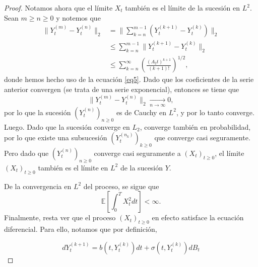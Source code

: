 \documentclass[letterpaper]{article}
\renewcommand{\to}{\rightarrow}
\newcommand{\E}{\mathbb{E}}
\newcommand{\1}{\mathds{1}}
\theoremstyle{definition}
\theoremstyle{definition}
\theoremstyle{definition}
\theoremstyle{definition}
\theoremstyle{definition}
\begin{document}
\begin{enumerate}
\begin{proof}
            Notamos ahora que el límite $X_t$ también es el límite de la sucesión en $L^2$. Sean $m\geq n\geq0$ y notemos que 
            \begin{align*}
                \|Y_t^{(m)}-Y_t^{(n)}\|_2&=\|\sum_{k=n}^{m-1}(Y_t^{(k+1)}-Y_t^{(k)})\|_2\\
                &\leq \sum_{k=n}^{m-1}\|Y_t^{(k+1)}-Y_t^{(k)}\|_2\\
                &\leq \sum_{k=n}^{\infty}\left(\frac{(A_2t)^{k+1}}{(k+1)!}\right)^{1/2},
            \end{align*}
            donde hemos hecho uso de la ecuación \eqref{eq5}. Dado que los coeficientes de la serie 
            anterior convergen (se trata de una serie exponencial), entonces se tiene que 
            \[
                \|Y_t^{(m)}-Y_t^{(n)}\|_2\xrightarrow[n\to\infty]{} 0,
            \]
            por lo que la sucesión $(Y_t^{(n)})_{n\geq0}$ es de Cauchy en $L^2$, y por lo 
            tanto converge. Luego. Dado que la sucesión converge en $L_2$, converge también en 
            probabilidad, por lo que existe una subsucesión $(Y_{t}^{(n_k)})_{k\geq0}$ que converge 
            casi seguramente. Pero dado que $(Y_t^{(n)})_{n\geq0}$ converge casi seguramente 
            a $(X_t)_{t\geq0}$, el límite $(X_t)_{t\geq0}$ también es el límite en $L^2$ de la sucesión $Y$.
            \newline

            De la convergencia en $L^2$ del proceso, se sigue que 
            \[
            \E\left[\int_{0}^{T}X_t^2dt\right]<\infty.
            \]
            Finalmente, resta ver que el proceso $(X_t)_{t\geq0}$ en efecto satisface la ecuación diferencial. Para ello, 
            notamos que por definición, 
            
            \begin{equation}\label{eq7}
                dY_t^{(k+1)}=b(t,Y_t^{(k)})dt+\sigma(t,Y_t^{(k)})dB_t    
            \end{equation}
            

\end{proof}
\end{enumerate}
\end{document}
